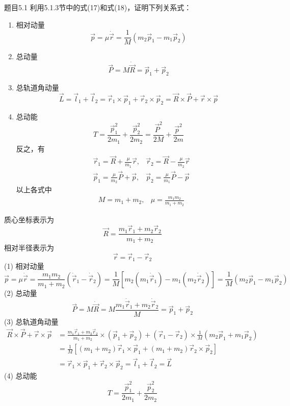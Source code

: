\begin{question}{题目5.1}
    利用5.1.3节中的式(17)和式(18)，证明下列关系式：
    \begin{enumerate}
        \item 相对动量
              $$
                  \vec{p}=\mu\dot{\vec{r}}=\frac{1}{M}\left(m_2\vec{p}_1-m_1\vec{p}_2\right)
              $$
        \item 总动量
              $$
                  \vec{P}=M\dot{\vec{R}} = \vec{p}_1+\vec{p}_2
              $$
        \item 总轨道角动量
              $$
                  \vec{L}=\vec{l}_1+\vec{l}_2
                  =\vec{r}_1\times\vec{p}_1+\vec{r}_2\times\vec{p}_2
                  =\vec{R}\times\vec{P}+\vec{r}\times\vec{p}
              $$
        \item 总动能
              $$
                  T=\frac{\vec{p}_1^2}{2m_1}+\frac{\vec{p}_2^2}{2m_2}
                  =\frac{\vec{P}^2}{2M}+\frac{\vec{p}^2}{2m}
              $$
              反之，有
              $$
                  \begin{aligned}
                       & \vec{r}_1=\vec{R}+\frac{\mu}{m_1}\vec{r},   & \vec{r}_2=\vec{R}-\frac{\mu}{m_2}\vec{r} \\
                       & \vec{p}_1 = \frac{\mu}{m_2}\vec{P}+\vec{p}, & \vec{p}_2=\frac{\mu}{m_1}\vec{P}-\vec{p}
                  \end{aligned}
              $$
              以上各式中
              $$
                  \begin{aligned}
                       & M=m_1+m_2, & \mu=\frac{m_1m_2}{m_1+m_2}
                  \end{aligned}
              $$
    \end{enumerate}
\end{question}
\begin{solution}
    质心坐标表示为
    $$
        \vec{R}=\frac{m_1\vec{r}_1+m_2\vec{r}_2}{m_1+m_2}
    $$
    相对半径表示为
    $$
        \vec{r}=\vec{r}_1-\vec{r}_2
    $$
    (1) 相对动量
    $$
        \vec{p}=\mu\dot{\vec{r}}
        =\frac{m_1m_2}{m_1+m_2}\left(\dot{\vec{r}}_1-\dot{\vec{r}}_2\right)
        =\frac{1}{M}[m_2(m_1\dot{\vec{r}}_1)-m_1(m_2\dot{\vec{r}}_2)]
        =\frac{1}{M}(m_2\vec{p}_1-m_1\vec{p}_2)
    $$
    (2) 总动量
    $$
        \vec{P}=M\dot{\vec{R}}
        =M\frac{m_1\dot{\vec{r}}_1+m_2\dot{\vec{r}}_2}{M}
        =\vec{p}_1+\vec{p}_2
    $$
    (3) 总轨道角动量
    $$
        \begin{aligned}
            \vec{R}\times\vec{P}+\vec{r}\times\vec{p}
             & =\frac{m_1\vec{r}_1+m_2\vec{r}_2}{m_1+m_2}\times\left(\vec{p}_1+\vec{p}_2\right)
            +\left(\vec{r}_1-\vec{r}_2\right)\times\frac{1}{M}\left(m_2\vec{p}_1+m_1\vec{p}_2\right) \\
             & =\frac{1}{M}[(m_1+m_2)\vec{r}_1\times\vec{p}_1 + (m_1+m_2)\vec{r}_2\times\vec{p}_2]   \\
             & =\vec{r}_1\times\vec{p}_1+\vec{r}_2\times\vec{p}_2=\vec{l}_1+\vec{l}_2=\vec{L}
        \end{aligned}
    $$
    (4) 总动能
    $$
        T=\frac{\vec{p}_1^2}{2m_1}+\frac{\vec{p}_2^2}{2m_2}
    $$
\end{solution}

